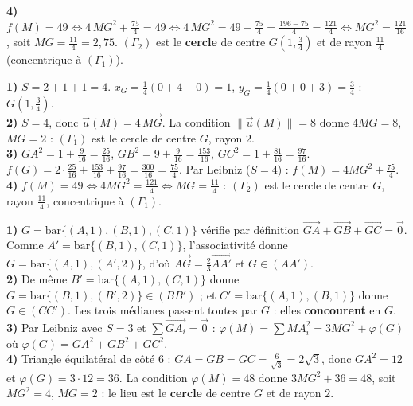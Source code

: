\textbf{4)} $f(M)=49\Leftrightarrow 4\,MG^{2}+\frac{75}{4}=49\Leftrightarrow 4\,MG^{2}=49-\frac{75}{4}=\frac{196-75}{4}=\frac{121}{4}\Leftrightarrow MG^{2}=\frac{121}{16}$, soit $MG=\frac{11}{4}=2{,}75$. $(\Gamma_2)$ est le \textbf{cercle} de centre $G\!\left(1,\frac34\right)$ et de rayon $\frac{11}{4}$ (concentrique à $(\Gamma_1)$).


\textbf{1)} $S=2+1+1=4$. $x_G=\frac14(0+4+0)=1$, $y_G=\frac14(0+0+3)=\frac34$ : $G\!\left(1,\frac34\right)$.\\
\textbf{2)} $S=4$, donc $\vec u(M)=4\,\overrightarrow{MG}$. La condition $\|\vec u(M)\|=8$ donne $4MG=8$, $MG=2$ : $(\Gamma_1)$ est le cercle de centre $G$, rayon $2$.\\
\textbf{3)} $GA^2=1+\frac9{16}=\frac{25}{16}$, $GB^2=9+\frac9{16}=\frac{153}{16}$, $GC^2=1+\frac{81}{16}=\frac{97}{16}$.
$f(G)=2\cdot\frac{25}{16}+\frac{153}{16}+\frac{97}{16}=\frac{300}{16}=\frac{75}{4}$. Par Leibniz ($S=4$) : $f(M)=4MG^2+\frac{75}4$.\\
\textbf{4)} $f(M)=49\Leftrightarrow 4MG^2=\frac{121}{4}\Leftrightarrow MG=\frac{11}{4}$ : $(\Gamma_2)$ est le cercle de centre $G$, rayon $\frac{11}4$, concentrique à $(\Gamma_1)$.

\textbf{1)} $G=\mathrm{bar}\{(A,1),(B,1),(C,1)\}$ vérifie par définition $\overrightarrow{GA}+\overrightarrow{GB}+\overrightarrow{GC}=\vec0$. Comme $A'=\mathrm{bar}\{(B,1),(C,1)\}$, l'associativité donne $G=\mathrm{bar}\{(A,1),(A',2)\}$, d'où $\overrightarrow{AG}=\frac{2}{3}\overrightarrow{AA'}$ et $G\in(AA')$.\\
\textbf{2)} De même $B'=\mathrm{bar}\{(A,1),(C,1)\}$ donne $G=\mathrm{bar}\{(B,1),(B',2)\}\in(BB')$ ; et $C'=\mathrm{bar}\{(A,1),(B,1)\}$ donne $G\in(CC')$. Les trois médianes passent toutes par $G$ : elles \textbf{concourent} en $G$.\\
\textbf{3)} Par Leibniz avec $S=3$ et $\sum\overrightarrow{GA_i}=\vec0$ : $\varphi(M)=\sum MA_i^2=3MG^2+\varphi(G)$ où $\varphi(G)=GA^2+GB^2+GC^2$.\\
\textbf{4)} Triangle équilatéral de côté $6$ : $GA=GB=GC=\frac{6}{\sqrt3}=2\sqrt3$, donc $GA^2=12$ et $\varphi(G)=3\cdot12=36$. La condition $\varphi(M)=48$ donne $3MG^2+36=48$, soit $MG^2=4$, $MG=2$ : le lieu est le \textbf{cercle} de centre $G$ et de rayon $2$.

